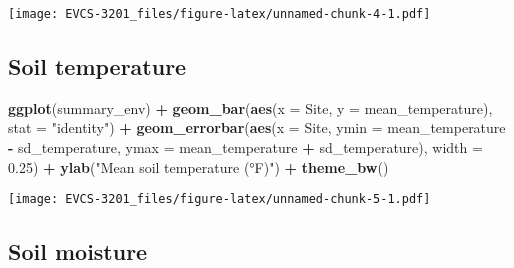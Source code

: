 \documentclass[]{book}
\newenvironment{Shaded}{\begin{snugshade}}{\end{snugshade}}
\newcommand{\KeywordTok}[1]{\textcolor[rgb]{0.13,0.29,0.53}{\textbf{#1}}}
\newcommand{\DataTypeTok}[1]{\textcolor[rgb]{0.13,0.29,0.53}{#1}}
\newcommand{\FloatTok}[1]{\textcolor[rgb]{0.00,0.00,0.81}{#1}}
\newcommand{\StringTok}[1]{\textcolor[rgb]{0.31,0.60,0.02}{#1}}
\newcommand{\OperatorTok}[1]{\textcolor[rgb]{0.81,0.36,0.00}{\textbf{#1}}}
\newcommand{\NormalTok}[1]{#1}
\begin{document}
\texttt{[image: EVCS-3201\_files/figure-latex/unnamed-chunk-4-1.pdf]}

\subsection*{Soil temperature}\label{soil-temperature}

\begin{Shaded}
\begin{Highlighting}[]
\KeywordTok{ggplot}\NormalTok{(summary_env) }\OperatorTok{+}
\StringTok{  }\KeywordTok{geom_bar}\NormalTok{(}\KeywordTok{aes}\NormalTok{(}\DataTypeTok{x =}\NormalTok{ Site, }\DataTypeTok{y =}\NormalTok{ mean_temperature), }\DataTypeTok{stat =} \StringTok{"identity"}\NormalTok{) }\OperatorTok{+}
\StringTok{  }\KeywordTok{geom_errorbar}\NormalTok{(}\KeywordTok{aes}\NormalTok{(}\DataTypeTok{x =}\NormalTok{ Site, }\DataTypeTok{ymin =}\NormalTok{ mean_temperature }\OperatorTok{-}\StringTok{ }\NormalTok{sd_temperature, }
                    \DataTypeTok{ymax =}\NormalTok{ mean_temperature }\OperatorTok{+}\StringTok{ }\NormalTok{sd_temperature),}
                \DataTypeTok{width =} \FloatTok{0.25}\NormalTok{) }\OperatorTok{+}
\StringTok{  }\KeywordTok{ylab}\NormalTok{(}\StringTok{"Mean soil temperature (°F)"}\NormalTok{) }\OperatorTok{+}
\StringTok{  }\KeywordTok{theme_bw}\NormalTok{()}
\end{Highlighting}
\end{Shaded}

\texttt{[image: EVCS-3201\_files/figure-latex/unnamed-chunk-5-1.pdf]}

\subsection*{Soil moisture}\label{soil-moisture}

\begin{Shaded}
\end{Shaded}
\end{document}
